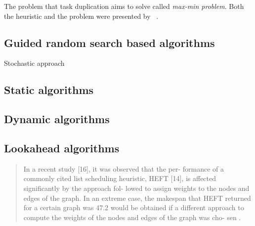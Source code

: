The problem that task duplication aims to solve called \emph{max-min
  problem}. Both the heuristic and the problem were presented
by \citeauthor{kruatrachue1987static}~\cite{kruatrachue1987static}.

\cite{shin2008task}

\subsection{Guided random search based algorithms}
\label{sec:random}

Stochastic approach~\cite{zheng20131673,grajcar1999genetic}

\subsection{Static algorithms}
\label{sec:static}


\subsection{Dynamic algorithms}
\label{sec:dynamic}

\subsection{Lookahead algorithms}
\label{sec:lookahead_state}

\cite{arabnejad2014list} \cite{bittencourt2010dag}

\begin{quote}
  In a recent study [16], it was observed that the per- formance of a
  commonly cited list scheduling heuristic, HEFT [14], is affected
  significantly by the approach fol- lowed to assign weights to the
  nodes and edges of the graph.  In an extreme case, the makespan that
  HEFT returned for a certain graph was
  47.2%
  would be obtained if a different approach to compute the weights of
  the nodes and edges of the graph was cho- sen \cite{zhao2003experimental}.
\end{quote}
\cleardoublepage

